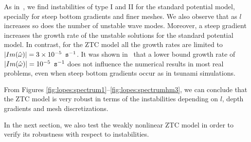 As in~\citet{LovholtPedersen2009}, we find
instabilities of type I and II  for the standard
potential model, specially for steep bottom gradients and finer meshes.
We also observe that as $l$ increases so does the number of
unstable wave modes.  Moreover, a steep gradient increases the
growth rate of the unstable solutions for the standard
potential model.
In contrast, for the ZTC model  all the growth rates are
limited to $|Im(\hat\omega)|=3\times 10^{-5}\,~{\tt s}^{-1}$.
It was shown in~\cite{LovholtPedersen2009} that a
lower bound growth rate of $|Im(\hat\omega)|=10^{-5}\,~{\tt
s}^{-1}$ does not influence the numerical results in most
real problems, even when steep bottom gradients occur as in
tsunami simulations.

From Figures \ref{fig:lopes:spectrum1}--\ref{fig:lopes:spectrumhm3},
 we can conclude that the ZTC model is very robust in terms
 of the instabilities depending on $l$, depth gradients and
 mesh discretizations.

In the next section, we  also test the weakly nonlinear ZTC
model in order to verify its robustness with respect to instabilities.

